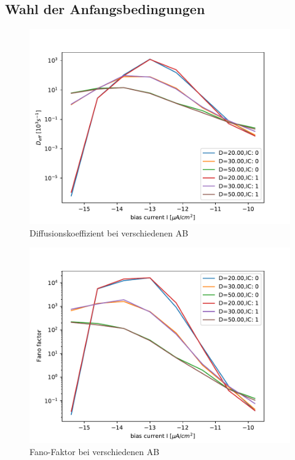 \documentclass[12pt,a4paper]{article}
\begin{document}
\subsection{Wahl der Anfangsbedingungen}
\begin{figure}[H]
	\centering
	\includegraphics[scale=1]{dneursinglerealrinzel15ninv0realrinzel15ninv1.pdf}\caption{Diffusionskoeffizient bei verschiedenen AB}
	\label{drinzelab}
\end{figure}
\begin{figure}[H]
	\centering
	\includegraphics[scale=1]{fneursinglerealrinzel15ninv0realrinzel15ninv1.pdf}\caption{Fano-Faktor bei verschiedenen AB}
	\label{frinzelab}
\end{figure}
\end{document}
